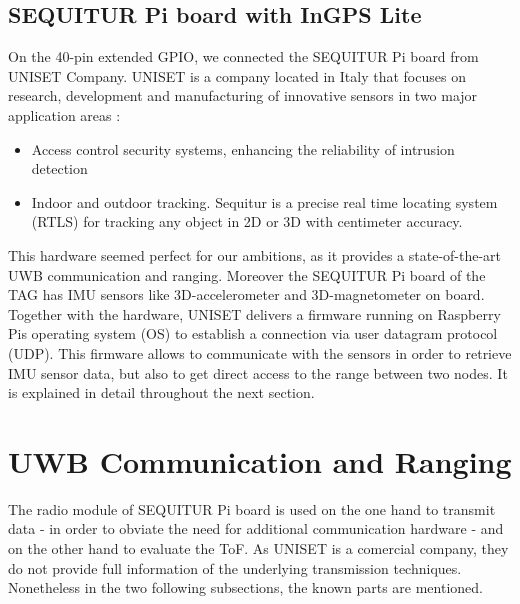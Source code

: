 \subsection{SEQUITUR Pi board with InGPS Lite}
On the 40-pin extended GPIO, we connected the SEQUITUR Pi board from UNISET Company. UNISET is a company located in Italy that focuses on research, development and manufacturing of innovative sensors in two major application areas \cite{Uniset}:

\begin{itemize}
\item Access control security systems, enhancing the reliability of intrusion detection
\item Indoor and outdoor tracking. Sequitur is a precise real time locating system (RTLS) for tracking any object in 2D or 3D with centimeter accuracy.
\end{itemize}

This hardware seemed perfect for our ambitions, as it provides a state-of-the-art UWB communication and ranging. Moreover the SEQUITUR Pi board of the TAG has IMU sensors like 3D-accelerometer and 3D-magnetometer on board. Together with the hardware, UNISET delivers a firmware running on Raspberry Pis operating system (OS) to establish a connection via user datagram protocol (UDP). This firmware allows to communicate with the sensors in order to retrieve IMU sensor data, but also to get direct access to the range between two nodes. It is explained in detail throughout the next section. 


\section{UWB Communication and Ranging}
The radio module of SEQUITUR Pi board is used on the one hand to transmit data - in order to obviate the need for additional communication hardware - and on the other hand to evaluate the ToF. As UNISET is a comercial company, they do not provide full information of the underlying transmission techniques. Nonetheless in the two following subsections, the known parts are mentioned.

